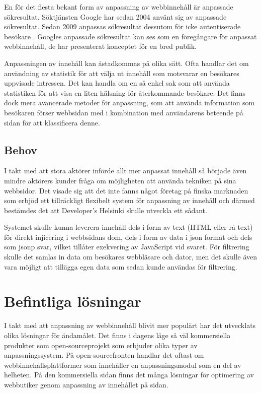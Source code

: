 En för det flesta bekant form av anpassning av webbinnehåll är anpassade sökresultat. Söktjänsten Google har sedan 2004 använt sig av anpassade sökresultat. Sedan 2009 anpassas sökresultat dessutom för icke autentiserade besökare \citep{Hannak:2013:MPW:2488388.2488435}. Googles anpassade sökresultat kan ses som en föregångare för anpassat webbinnehåll, de har presenterat konceptet för en bred publik.

Anpassningen av innehåll kan åstadkommas på olika sätt. Ofta handlar det om användning av statistik för att välja ut innehåll som motsvarar en besökares uppvisade intressen. Det kan handla om en så enkel sak som att använda statistiken för att visa en liten hälsning för återkommande besökare. Det finns dock mera avancerade metoder för anpassning, som att använda information som besökaren förser webbsidan med i kombination med användarens beteende på sidan för att klassificera denne. \citep{Albanese:2004:WPB:1031453.1031469} 

\subsection{Behov}

I takt med att stora aktörer införde allt mer anpassat innehåll så började även mindre aktörers kunder fråga om möjligheten att använda tekniken på sina webbsidor. Det visade sig att det inte fanns något företag på finska marknaden som erbjöd ett tillräckligt flexibelt system för anpassning av innehåll och därmed bestämdes det att Developer's Helsinki skulle utveckla ett sådant.

Systemet skulle kunna leverera innehåll dels i form av text (HTML eller rå text) för direkt injicering i webbsidans \gls{dom}, dels i form av data i \gls{json} format och dels som \gls{jsonp} svar, vilket tillåter exekvering av JavaScript vid svaret. För filtrering skulle det samlas in data om besökares webbläsare och dator, men det skulle även vara möjligt att tillägga egen data som sedan kunde användas för filtrering.

\section{Befintliga lösningar}

I takt med att anpassning av webbinnehåll blivit mer populärt har det utvecklats olika lösningar för ändamålet. Det finns i dagens läge så väl kommersiella produkter som open-sourceprojekt som erbjuder olika typer av anpassningssystem. På open-sourcefronten handlar det oftast om webbinnehållsplattformer som innehåller en anpassningsmodul som en del av helheten. På den kommersiella sidan finns det många lösningar för optimering av webbutiker genom anpassning av innehållet på sidan.

